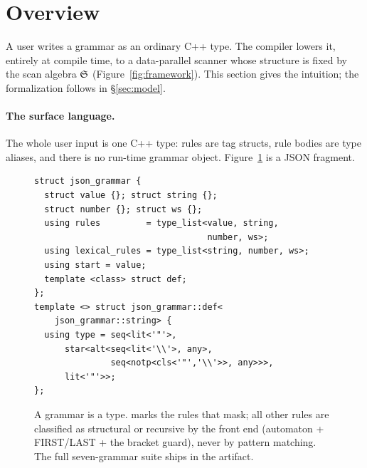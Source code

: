 \section{Overview}
\label{sec:overview}

A user writes a grammar as an ordinary C++ type.  The compiler lowers it,
entirely at compile time, to a data-parallel scanner whose structure is fixed by
the scan algebra $\mathfrak{S}$ (Figure~\ref{fig:framework}).  This section gives the intuition; the
formalization follows in \S\ref{sec:model}.



\paragraph{The surface language.}
The whole user input is one C++ type: rules are tag structs, rule bodies are
type aliases, and there is no run-time grammar object.  Figure~\ref{fig:grammar}
is a JSON fragment.

\begin{figure}[t]
\begin{lstlisting}
struct json_grammar {
  struct value {}; struct string {};
  struct number {}; struct ws {};
  using rules         = type_list<value, string,
                                  number, ws>;
  using lexical_rules = type_list<string, number, ws>;
  using start = value;
  template <class> struct def;
};
template <> struct json_grammar::def<
    json_grammar::string> {
  using type = seq<lit<'"'>,
      star<alt<seq<lit<'\\'>, any>,
               seq<notp<cls<'"','\\'>>, any>>>,
      lit<'"'>>;
};
\end{lstlisting}
\caption{A grammar is a type.   marks the rules that mask;
all other rules are classified as structural or recursive by the front end
(automaton + FIRST/LAST + the bracket guard), never by pattern matching.
The full seven-grammar suite ships in the artifact.}
\label{fig:grammar}
\end{figure}

